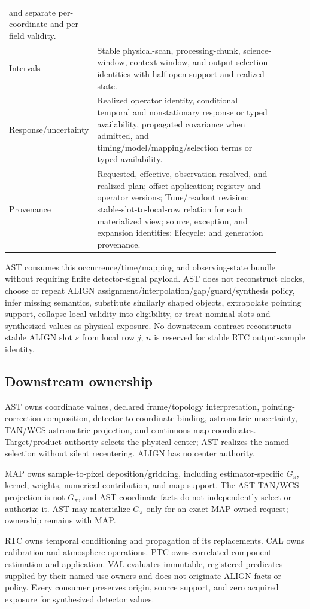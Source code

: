 \begin{longtable}{L{0.22\linewidth}L{0.68\linewidth}}
and separate per-coordinate and per-field validity.\\
Intervals & Stable physical-scan, processing-chunk, science-window,
context-window, and output-selection identities with half-open support and
realized state.\\
Response/uncertainty & Realized operator identity, conditional temporal and
nonstationary response or typed availability, propagated covariance when
admitted, and timing/model/mapping/selection terms or typed availability.\\
Provenance & Requested, effective, observation-resolved, and realized plan;
offset application; registry and operator versions; Tune/readout revision;
stable-slot-to-local-row relation for each materialized view; source,
exception, and expansion identities; lifecycle; and generation provenance.\\
\bottomrule
\end{longtable}

AST consumes this occurrence/time/mapping and observing-state bundle without
requiring finite detector-signal payload.  AST does not reconstruct clocks,
choose or repeat ALIGN assignment/interpolation/gap/guard/synthesis policy,
infer missing semantics, substitute similarly shaped objects, extrapolate
pointing support, collapse local validity into eligibility, or treat nominal
slots and synthesized values as physical exposure.
No downstream contract reconstructs stable ALIGN slot \(s\) from local row
\(j\); \(n\) is reserved for stable RTC output-sample identity.

\subsection{Downstream ownership}

AST owns coordinate values, declared frame/topology interpretation,
pointing-correction composition, detector-to-coordinate binding, astrometric
uncertainty, TAN/WCS astrometric projection, and continuous map coordinates.
Target/product authority selects the physical center; AST realizes the named
selection without silent recentering.  ALIGN has no center authority.

MAP owns sample-to-pixel deposition/gridding, including estimator-specific
\(G_{\pi}\), kernel, weights, numerical contribution, and map support.  The
AST TAN/WCS projection is not \(G_{\pi}\), and AST coordinate facts do not
independently select or authorize it.  AST may materialize \(G_{\pi}\) only
for an exact MAP-owned request; ownership remains with MAP.

RTC owns temporal conditioning and propagation of its replacements.  CAL owns
calibration and atmosphere operations.  PTC owns correlated-component
estimation and application.  VAL evaluates immutable, registered predicates
supplied by their named-use owners and does not originate ALIGN facts or
policy.  Every consumer preserves origin, source support, and zero acquired
exposure for synthesized detector values.
